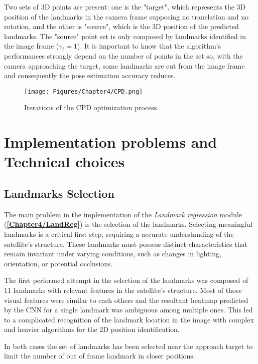 Two sets of 3D points are present: one is the "target", which represents the 3D position of the landmarks in the camera frame supposing no translation and no rotation, and the other is "source", which is the 3D position of the predicted landmarks.
The "source" point set is only composed by landmarks identified in the image frame (\(v_i = 1\)). It is important to know that the algorithm's performances strongly depend on the number of points in the set so, with the camera approaching the target, some landmarks are cut from the image frame and consequently the pose estimation accuracy reduces.

\begin{figure}[H]
    \centering
    \texttt{[image: Figures/Chapter4/CPD.png]}
    \caption[Iterations of the CPD optimization process.]{Iterations of the CPD optimization process.}
    \label{fig:CPD}
\end{figure}

\section{Implementation problems and Technical choices }
\subsection{Landmarks Selection}
\label{Chapter4/LandmarksSel}
The main problem in the implementation of the \textit{Landmark regression} module (\textbf{\ref{Chapter4/LandReg}}) is the selection of the landmarks.
Selecting meaningful landmarks is a critical first step, requiring a accurate understanding of the satellite's structure. These landmarks must possess distinct characteristics that remain invariant under varying conditions, such as changes in lighting, orientation, or potential occlusions.

The first performed attempt in the selection of the landmarks was composed of 11 landmarks with relevant features in the satellite's structure. Most of those visual features were similar to each others and the resultant heatmap predicted by the CNN for a single landmark was ambiguous among multiple ones. This led to a complicated recognition of the landmark location in the image with complex and heavier algorithms for the 2D position identification.

In both cases the set of landmarks has been selected near the approach target to limit the number of out of frame landmark in closer positions.


